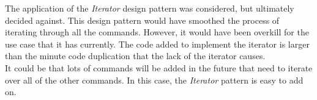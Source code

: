 The application of the \textit{Iterator} design pattern was considered, but ultimately decided against. This design pattern would have smoothed the process of iterating through all the commands. However, it would have been overkill for the use case that it has currently. The code added to implement the iterator is larger than the minute code duplication that the lack of the iterator causes. \\
It could be that lots of commands will be added in the future that need to iterate over all of the other commands. In this case, the \textit{Iterator} pattern is easy to add on.\\~\\